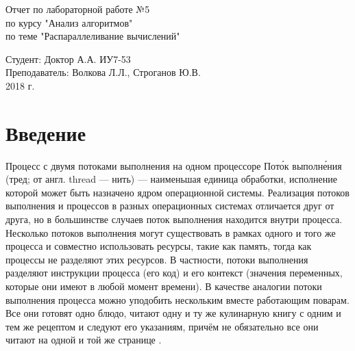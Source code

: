 \documentclass[a4paper, 14pt]{article}
\begin{document}
	\begin{titlepage}
		\begin{center}
			\begin{LARGE}
				Отчет по лабораторной работе №5\\
					по курсу "Анализ алгоритмов"\\
					по теме "Распараллеливание вычислений"
			\end{LARGE}
		
			\begin{Large}
				\vspace{10cm}
				Студент: Доктор А.А. ИУ7-53\\
					Преподаватель: Волкова Л.Л.,
								   Строганов Ю.В.\\
				
				\vspace{5cm}2018 г.				   
			\end{Large}
			
		\end{center}
		 
	\end{titlepage}

\tableofcontents
	
\newpage
\section*{Введение}
\hspace{1cm}


Процесс с двумя потоками выполнения на одном процессоре
Пото́к выполне́ния (тред; от англ. thread — нить) — наименьшая единица обработки, исполнение которой может быть назначено ядром операционной системы. Реализация потоков выполнения и процессов в разных операционных системах отличается друг от друга, но в большинстве случаев поток выполнения находится внутри процесса. Несколько потоков выполнения могут существовать в рамках одного и того же процесса и совместно использовать ресурсы, такие как память, тогда как процессы не разделяют этих ресурсов. В частности, потоки выполнения разделяют инструкции процесса (его код) и его контекст (значения переменных, которые они имеют в любой момент времени). В качестве аналогии потоки выполнения процесса можно уподобить нескольким вместе работающим поварам. Все они готовят одно блюдо, читают одну и ту же кулинарную книгу с одним и тем же рецептом и следуют его указаниям, причём не обязательно все они читают на одной и той же странице \cite{multithreading_begin}.
\end{document}
